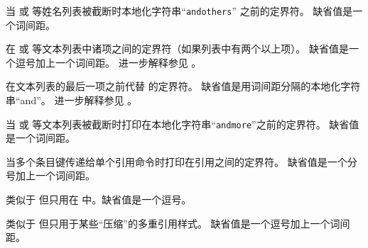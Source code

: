 \begin{ltxsyntax}
\CSdelimMark
当  或  等姓名列表被截断时本地化字符串“\texttt{andothers}” 之前的定界符。
缺省值是一个词间距。

\CSdelimMark
在  或  等文本列表中诸项之间的定界符（如果列表中有两个以上项）。
缺省值是一个逗号加上一个词间距。
进一步解释参见 。

\CSdelimMark
在文本列表的最后一项之前代替  的定界符。
缺省值是用词间距分隔的本地化字符串“and”。
进一步解释参见 。

\CSdelimMark
当  或  等文本列表被截断时打印在本地化字符串“\texttt{andmore}”之前的定界符。
缺省值是一个词间距。

当多个条目键传递给单个引用命令时打印在引用之间的定界符。
缺省值是一个分号加上一个词间距。

类似于  但只用在  中。缺省值是一个逗号。

类似于  但只用于某些“压缩”的多重引用样式。
缺省值是一个逗号加上一个词间距。


\end{ltxsyntax}
